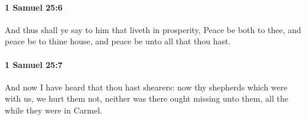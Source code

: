 		\paragraph{1 Samuel 25:6} %
			\label{1SAMUEL-25-6}

			And thus shall ye say to him that liveth in prosperity, Peace be both to thee, and peace be to thine house, and peace be unto all that thou hast.


		\paragraph{1 Samuel 25:7} %
			\label{1SAMUEL-25-7}

			And now I have heard that thou hast shearers: now thy shepherds which were with us, we hurt them not, neither was there ought missing unto them, all the while they were in Carmel.


